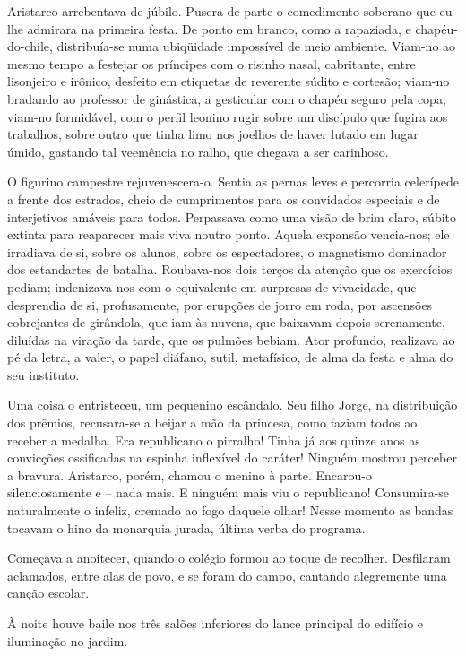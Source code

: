 Aristarco arrebentava de júbilo. Pusera de parte o comedimento soberano que eu
lhe admirara na primeira festa. De ponto em branco, como a rapaziada, e
chapéu{}-do{}-chile, distribuía{}-se numa ubiqüidade impossível de meio
ambiente. Viam{}-no ao mesmo tempo a festejar os príncipes com o
risinho nasal, cabritante, entre lisonjeiro e irônico, desfeito em
etiquetas de reverente súdito e cortesão; viam{}-no bradando ao
professor de ginástica, a gesticular com o chapéu seguro pela copa;
viam{}-no formidável, com o perfil leonino rugir sobre um discípulo que
fugira aos trabalhos, sobre outro que tinha limo nos joelhos de haver
lutado em lugar úmido, gastando tal veemência no ralho, que chegava a
ser carinhoso. 

O figurino campestre rejuvenescera{}-o. Sentia as pernas
leves e percorria celerípede a frente dos estrados, cheio de
cumprimentos para os convidados especiais e de interjetivos amáveis
para todos. Perpassava como uma visão de brim claro, súbito extinta
para reaparecer mais viva noutro ponto. Aquela expansão vencia{}-nos;
ele irradiava de si, sobre os alunos, sobre os espectadores, o
magnetismo dominador dos estandartes de batalha. Roubava{}-nos dois
terços da atenção que os exercícios pediam; indenizava{}-nos com o
equivalente em surpresas de vivacidade, que desprendia de si,
profusamente, por erupções de jorro em roda, por ascensões cobrejantes
de girândola, que iam às nuvens, que baixavam depois serenamente,
diluídas na viração da tarde, que os pulmões bebiam. Ator profundo,
realizava ao pé da letra, a valer, o papel diáfano, sutil, metafísico,
de alma da festa e alma do seu instituto. 

Uma coisa o entristeceu, um pequenino escândalo. Seu filho Jorge, 
na distribuição dos prêmios, recusara{}-se a beijar a mão da princesa, 
como faziam todos ao receber a medalha. Era republicano o pirralho! 
Tinha já aos quinze anos as
convicções ossificadas na espinha inflexível do caráter! Ninguém
mostrou perceber a bravura. Aristarco, porém, chamou o menino à parte.
Encarou{}-o silenciosamente e -- nada mais. E ninguém mais viu o
republicano! Consumira{}-se naturalmente o infeliz, cremado ao fogo
daquele olhar! Nesse momento as bandas tocavam o hino da monarquia
jurada, última verba do programa. 

Começava a anoitecer, quando o
colégio formou ao toque de recolher. Desfilaram aclamados, entre alas
de povo, e se foram do campo, cantando alegremente uma canção escolar.

À noite houve baile nos três salões inferiores do lance principal do
edifício e iluminação no jardim. 

